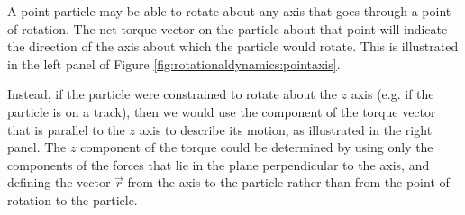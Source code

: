 A point particle may be able to rotate about any axis that goes through a point of rotation. The net torque vector on the particle about that point will indicate the direction of the axis about which the particle would rotate. This is illustrated in the left panel of Figure \ref{fig:rotationaldynamics:pointaxis}.

Instead, if the particle were constrained to rotate about the $z$ axis (e.g. if the particle is on a track), then we would use the component of the torque vector that is parallel to the $z$ axis to describe its motion, as illustrated in the right panel. The $z$ component of the torque could be determined by using only the components of the forces that lie in the plane perpendicular to the axis, and defining the vector $\vec r$ from the axis to the particle rather than from the point of rotation to the particle.



